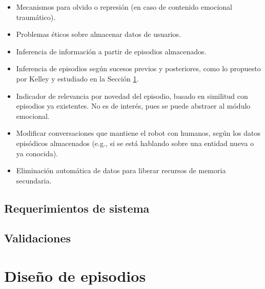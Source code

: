 \begin{itemize}
\item Mecanismos para olvido o represión (en caso de contenido emocional traumático).
\item Problemas éticos sobre almacenar datos de usuarios.
\item Inferencia de información a partir de episodios almacenados.
\item Inferencia de episodios según sucesos previos y posteriores, como lo propuesto por Kelley \cite{Kelley2014} y estudiado en la Sección \ref{}.
\item Indicador de relevancia por novedad del episodio, basado en similitud con episodios ya existentes. No es de interés, pues se puede abstraer al módulo emocional.
\item Modificar conversaciones que mantiene el robot con humanos, según los datos episódicos almacenados (e.g., si se está hablando sobre una entidad nueva o ya conocida).
\item Eliminación automática de datos para liberar recursos de memoria secundaria.
\end{itemize}

\subsection{Requerimientos de sistema}



\subsection{Validaciones}





\section{Diseño de episodios}

